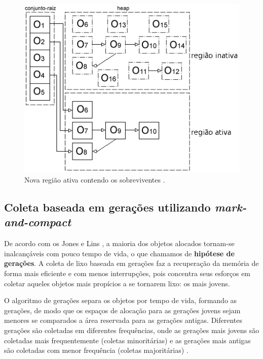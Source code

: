 \documentclass[ccc, pg2]{esinucpel}
\begin{document}
\begin{figure}[h]
\centering
\includegraphics[scale=.55]{images/twospace_collected.png}
\caption{Nova região ativa contendo os sobreviventes \cite{bib:marcos}.}
\label{fig:twospacecol}
\end{figure}

\subsection{Coleta baseada em gerações utilizando \textit{mark-and-compact}} \label{sec:gen}
De acordo com os Jones e Lins \cite{bib:lins:gc}, a maioria dos objetos alocados tornam-se inalcançáveis com pouco tempo de vida, o que chamamos de {\bf hipótese de gerações}. A coleta de lixo baseada em gerações faz a recuperação da memória de forma mais eficiente e com menos interrupções, pois concentra seus esforços em coletar aqueles objetos mais propícios a se tornarem lixo: os mais jovens.

O algoritmo de gerações separa os objetos por tempo de vida, formando as gerações, de modo que os espaços de alocação para as gerações jovens sejam menores se comparados a área reservada para as gerações antigas. Diferentes gerações são coletadas em diferentes frequências, onde as gerações mais jovens são coletadas mais frequentemente (coletas minoritárias) e as gerações mais antigas são coletadas com menor frequência (coletas majoritárias) \cite{bib:lins:gc}.
\end{document}
